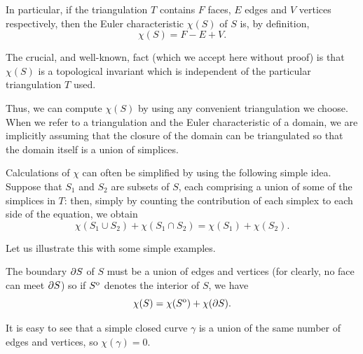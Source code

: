 \begin{remark}[$\chi(S) = F - E + V$]
    In particular, if the triangulation $T$ contains $F$ faces, $E$ edges and
    $V$ vertices respectively, then the Euler characteristic $\chi(S)$ of $S$
    is, by definition,
    \begin{equation*}
        \chi(S) = F - E + V.
    \end{equation*}
\end{remark}

\begin{theorem}
    The crucial, and well-known, fact (which we accept here without proof) is
    that $\chi(S)$ is a topological invariant which is independent of the
    particular triangulation $T$ used.
\end{theorem}

Thus, we can compute $\chi(S)$ by using any convenient triangulation we choose.
When we refer to a triangulation and the Euler characteristic of a domain, we
are implicitly assuming that the closure of the domain can be triangulated so
that the domain itself is a union of simplices.

Calculations of $\chi$ can often be simplified by using the following simple
idea. Suppose that $S_1$ and $S_2$ are subsets of $S$, each comprising a union
of some of the simplices in $T$: then, simply by counting the contribution of
each simplex to each side of the equation, we obtain
\begin{equation}
    \label{eq:euler_characteristic_is_sum_of_interior_and_boundary_characteristics}
    \chi(S_1 \cup S_2) + \chi(S_1 \cap S_2) = \chi(S_1) + \chi(S_2).
\end{equation}

Let us illustrate this with some simple examples.

\begin{example}[$\chi(S) = \chi(\interior{S}) + \chi(\boundary{S})$]
    The boundary $\partial {S}$ of $S$ must be a union of edges and vertices
    (for clearly, no face can meet $\partial {S}$) so if ${S}^{\mathrm{o}}$ denotes
    the interior of $S$, we have
    \begin{equation*}
        \chi(S) = \chi({S}^{\mathrm{o}}) + \chi(\partial {S}).
    \end{equation*}
\end{example}

\begin{example}[$\chi(\gamma) = 0$]
    It is easy to see that a simple closed curve $\gamma$ is a union of the same
    number of edges and vertices, so $\chi(\gamma) = 0$.
\end{example}

